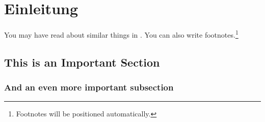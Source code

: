 \chapter{Einleitung}\label{ch:einleitung}

You may have read about similar things in \cite{Goodliffe2007}.
You can also write footnotes.\footnote{Footnotes will be positioned automatically.}
\blindtext

\blindtext

\section{This is an Important Section}
\blindtext

\subsection{And an even more important subsection}
\blindtext
